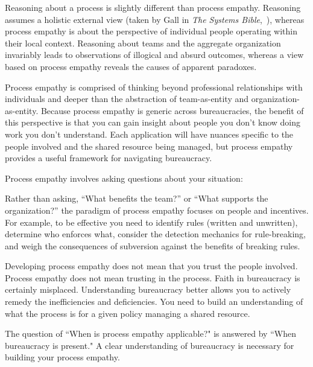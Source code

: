 Reasoning about a process is slightly different than process empathy. Reasoning assumes a holistic external view (taken by Gall in \textit{The Systems Bible},~\cite{2002_Gall}), whereas process empathy is about the perspective of individual people operating within their local context. Reasoning about teams and the aggregate organization invariably leads to observations of illogical and absurd outcomes, whereas a view based on process empathy reveals the causes of apparent paradoxes.

Process empathy is comprised of thinking beyond professional relationships with individuals and deeper than the abstraction of team-as-entity and organization-as-entity. 
Because process empathy is generic across bureaucracies, the benefit of this perspective is that you can gain insight about people you don't know doing work you don't understand.
Each application will have nuances specific to the people involved and the shared resource being managed, but process empathy provides a useful framework for navigating bureaucracy.


Process empathy involves asking questions about your situation:

Rather than asking, ``What benefits the team?'' or ``What supports the organization?'' the paradigm of process empathy focuses on people and incentives. %
For example, to be effective you need to 
identify rules (written and unwritten), determine who enforces what, consider the detection mechanics for rule-breaking, and weigh the consequences of subversion against the benefits of breaking rules.

Developing process empathy does not mean that you trust the people involved. Process empathy does not mean trusting in the process. Faith in bureaucracy is certainly misplaced. Understanding bureaucracy better allows you to actively remedy the inefficiencies and deficiencies. 
You need to build an understanding of what the process is for a given policy managing a \gls{shared resource}. 

The question of ``When is process empathy applicable?" is answered by ``When bureaucracy is present." A clear understanding of bureaucracy is necessary for building your process empathy.
